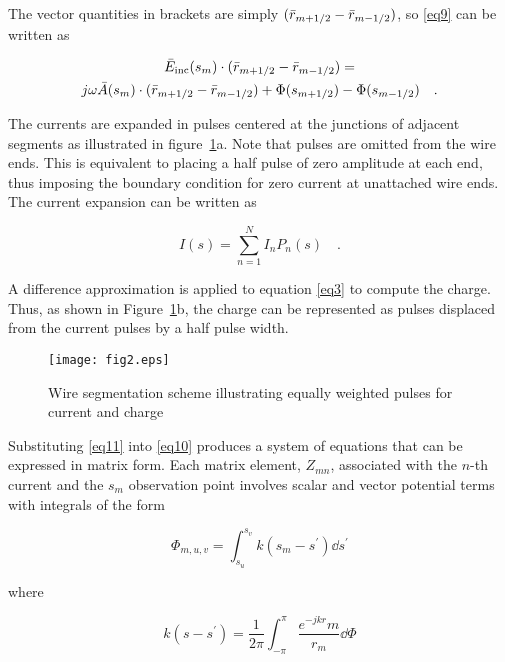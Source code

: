 \documentclass[12pt]{article}
\begin{document}
The vector quantities in brackets are simply
$(\bar{r}_{m+1/2} - \bar{r}_{m-1/2})$,
so \eqref{eq9} can be written as

\begin{equation}
\begin{gathered}
\bar{E}_{\mathrm{inc}}(s_m)\cdot(\bar{r}_{m+1/2}-\bar{r}_{m-1/2}) = \\
j\omega\bar{A}(s_m)\cdot(\bar{r}_{m+1/2}-\bar{r}_{m-1/2})
+\Phi(s_{m+1/2}) - \Phi(s_{m-1/2})
\quad.
\end{gathered}
\label{eq10}
\end{equation}

The currents are expanded in pulses centered at the junctions of
adjacent segments as illustrated in figure~\ref{fig2}a. Note that pulses
are omitted from the wire ends. This is equivalent to placing a half
pulse of zero amplitude at each end, thus imposing the boundary
condition for zero current at unattached wire ends. The current
expansion can be written as

\begin{equation}
I(s) = \sum_{n=1}^{N} I_n P_n (s)
\quad.
\label{eq11}
\end{equation}

A difference approximation is applied to equation \eqref{eq3} to compute
the charge. Thus, as shown in Figure~\ref{fig2}b, the charge can be
represented as pulses displaced from the current pulses by a half pulse
width.

\begin{figure}[htb]
\centerline{\texttt{[image: fig2.eps]}}
\caption{Wire segmentation scheme illustrating equally weighted pulses
for current and charge}
\label{fig2}
\end{figure}

Substituting \eqref{eq11} into \eqref{eq10} produces a system of
equations that can be expressed in matrix form. Each matrix element,
$Z_{mn}$, associated with the \mbox{$n$-th} current and the $s_m$ observation
point involves scalar and vector potential terms with integrals of the
form

\begin{equation}
\Phi_{m,u,v} = \int_{s_u}^{s_v} k(s_m - s^\prime)\dd{s^\prime}
\label{eq12}
\end{equation}

where

\begin{equation}
k(s-s^\prime) = \frac{1}{2\pi}\int_{-\pi}^\pi\frac{e^{-jkr}m}{r_m}\dd{\Phi}
\label{eq13}
\end{equation}
\end{document}
